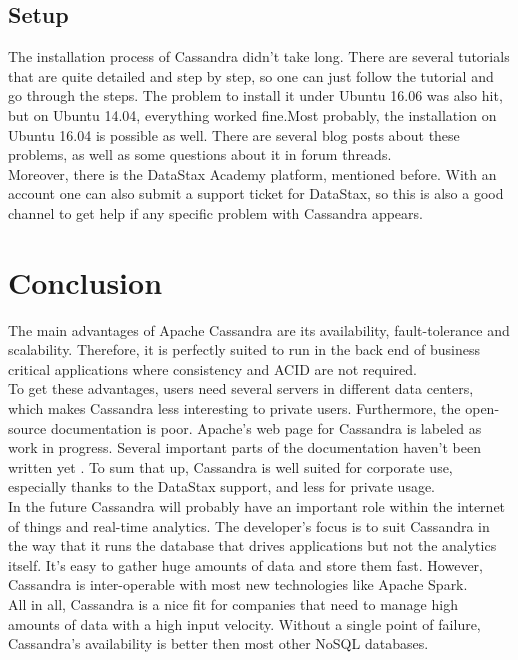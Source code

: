 \subsection{Setup}
The installation process of Cassandra didn't take long. There are several tutorials that are quite detailed and step by step, so one can just follow the tutorial and go through the steps. The problem to install it under Ubuntu 16.06 was also hit, but on Ubuntu 14.04, everything worked fine.Most probably, the installation on Ubuntu 16.04 is possible as well. There are several blog posts about these problems, as well as some questions about it in forum threads. \\
Moreover, there is the DataStax Academy platform, mentioned before. With an account one can also submit a support ticket for DataStax, so this is also a good channel to get help if any specific problem with Cassandra appears.

\clearpage
\section{Conclusion}
The main advantages of Apache Cassandra are its availability, fault-tolerance and scalability. Therefore, it is perfectly suited to run in the back end of business critical applications where consistency and ACID are not required. \\
To get these advantages, users need several servers in different data centers, which makes Cassandra less interesting to private users. Furthermore, the open-source documentation is poor. Apache's web page for Cassandra is labeled as work in progress. Several important parts of the documentation haven't been written yet \cite{apacheDocu}. To sum that up, Cassandra is well suited for corporate use, especially thanks to the DataStax support, and less for private usage. \\
In the future Cassandra will probably have an important role within the internet of things and real-time analytics. The developer's focus is to suit Cassandra in the way that it runs the database that drives applications but not the analytics itself. It's easy to gather huge amounts of data and store them fast. However, Cassandra is inter-operable with most new technologies like Apache Spark. \\
All in all, Cassandra is a nice fit for companies that need to manage high amounts of data with a high input velocity. Without a single point of failure, Cassandra's availability is better then most other NoSQL databases.
